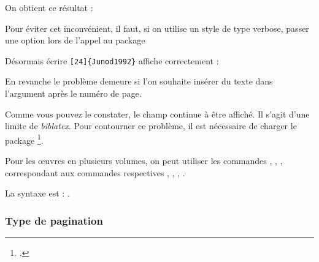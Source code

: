 On obtient ce résultat :

\begin{quotation}
\end{quotation}



Pour éviter cet inconvénient, il faut, si on utilise un style de type verbose, passer une option lors de l'appel au package 

\begin{latexcode}
\usepackage[citestyle=verbose,citepages=omit]{biblatex}
\end{latexcode}

Désormais écrire \verb|[24]{Junod1992}|
affiche correctement :

\begin{quotation}
\cite[24]{Junod1992}
\end{quotation}

En revanche le problème demeure si l'on souhaite insérer du texte dans l'argument  après le numéro de page.

\begin{latexcode}
\cite[\pno~24, passage fort intéressant.]{Junod1992}
\end{latexcode}

\begin{quotation}
\cite[\pno~24, passage fort intéressant.]{Junod1992}
\end{quotation}

Comme vous pouvez le constater, le champ  continue à être affiché. Il s'agit d'une limite de \emph{biblatex}. Pour contourner ce problème, il est nécessaire de charger le package \footcite{biblatex-true-citepages-omit}. 






\begin{plusloins}
Pour les œuvres en plusieurs volumes, on peut utiliser les commandes , , ,  correspondant aux commandes respectives , , , .

La syntaxe est  : 
.
\end{plusloins}

\subsubsection{Type de pagination}

